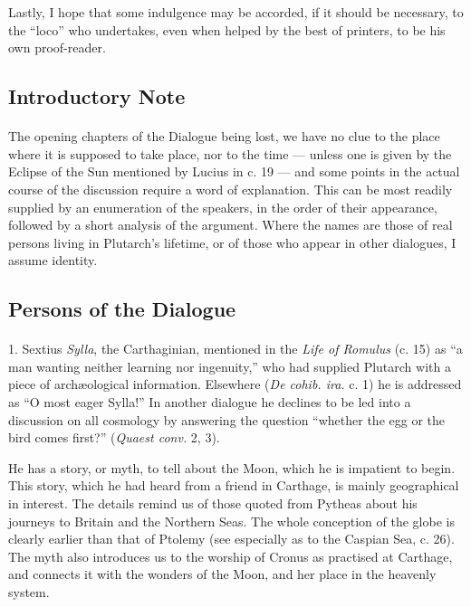 \documentclass[a4paper, 11pt, oneside, polutonikogreek, english]{article}
\begin{document}
Lastly, I hope that some indulgence may be accorded, if it should be necessary, to the ``loco'' who undertakes, even when helped by the best of printers, to be his own proof-reader.

\subsection*{Introductory Note}
\paragraph{}
The opening chapters of the Dialogue being lost, we have no clue to the place where it is supposed to take place, nor to the time --- unless one is given by the Eclipse of the Sun mentioned by Lucius in c. 19 --- and some points in the actual course of the discussion require a word of explanation. This can be most readily supplied by an enumeration of the speakers, in the order of their appearance, followed by a short analysis of the argument. Where the names are those of real persons living in Plutarch's lifetime, or of those who appear in other dialogues, I assume identity.

\subsection*{Persons of the Dialogue}
\paragraph{}
1. Sextius \emph{Sylla}, the Carthaginian, mentioned in the \emph{Life of Romulus} (c. 15) as ``a man wanting neither learning nor ingenuity,'' who had supplied Plutarch with a piece of archæological information. Elsewhere (\emph{De cohib. ira.} c. 1) he is addressed as ``O most eager Sylla!'' In another dialogue he declines to be led into a discussion on all cosmology by answering the question ``whether the egg or the bird comes first?'' (\emph{Quaest conv.} 2, 3).

He has a story, or myth, to tell about the Moon, which he is impatient to begin. This story, which he had heard from a friend in Carthage, is mainly geographical in interest. The details remind us of those quoted from Pytheas about his journeys to Britain and the Northern Seas. The whole conception of the globe is clearly earlier than that of Ptolemy (see especially as to the Caspian Sea, c. 26). The myth also introduces us to the worship of Cronus as practised at Carthage, and connects it with the wonders of the Moon, and her place in the heavenly system.
\end{document}
